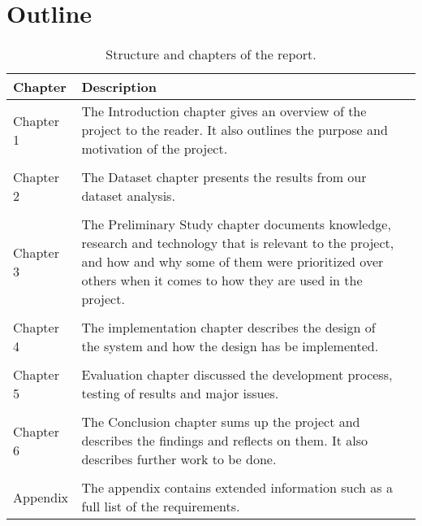 \section{Outline}
\begin{table}[H]
  \centering
  \begin{tabularx}{\textwidth}{ l X l }
  \toprule
    \textbf{Chapter}      & \textbf{Description} \\ \midrule
    Chapter 1 & The Introduction chapter gives an overview of the project to the reader. It also outlines the purpose and motivation of the project. \\
    \hline \\ [-1.5ex]
    Chapter 2 & The Dataset chapter presents the results from our dataset analysis. \\
    \hline \\ [-1.5ex]
    Chapter 3 & The Preliminary Study chapter documents knowledge, research and technology that is relevant to the project, and how and why some of them were prioritized over others when it comes to how they are used in the project. \\
    \hline \\ [-1.5ex]
    Chapter 4 & The implementation chapter describes the design of the system and how the design has be implemented. \\
    \hline \\ [-1.5ex]
    Chapter 5 & Evaluation chapter discussed the development process, testing of results and major issues. \\
    \hline \\ [-1.5ex]
    Chapter 6 & The Conclusion chapter sums up the project and describes the findings and reflects on them. It also describes further work to be done. \\
 	\hline \\ [-1.5ex]
    Appendix & The appendix contains extended information such as a full list of the requirements. \\
  \bottomrule
  \end{tabularx}
  \caption{Structure and chapters of the report.}
  \label{table-reportstructure}
\end{table}
